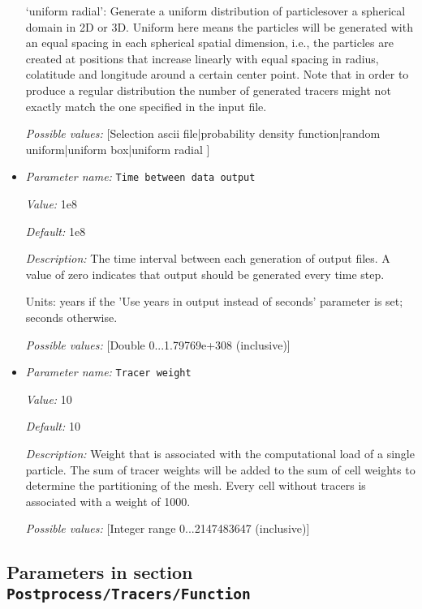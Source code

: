 \begin{itemize}
`uniform radial': Generate a uniform distribution of particlesover a spherical domain in 2D or 3D. Uniform here means the particles will be generated with an equal spacing in each spherical spatial dimension, i.e., the particles are created at positions that increase linearly with equal spacing in radius, colatitude and longitude around a certain center point. Note that in order to produce a regular distribution the number of generated tracers might not exactly match the one specified in the input file.


{\it Possible values:} [Selection ascii file|probability density function|random uniform|uniform box|uniform radial ]
\item {\it Parameter name:} {\tt Time between data output}
\label{parameters:Postprocess/Tracers/Time between data output}


{\it Value:} 1e8


{\it Default:} 1e8


{\it Description:} The time interval between each generation of output files. A value of zero indicates that output should be generated every time step.

Units: years if the 'Use years in output instead of seconds' parameter is set; seconds otherwise.


{\it Possible values:} [Double 0...1.79769e+308 (inclusive)]
\item {\it Parameter name:} {\tt Tracer weight}
\label{parameters:Postprocess/Tracers/Tracer weight}


{\it Value:} 10


{\it Default:} 10


{\it Description:} Weight that is associated with the computational load of a single particle. The sum of tracer weights will be added to the sum of cell weights to determine the partitioning of the mesh. Every cell without tracers is associated with a weight of 1000.


{\it Possible values:} [Integer range 0...2147483647 (inclusive)]
\end{itemize}



\subsection{Parameters in section \tt Postprocess/Tracers/Function}
\label{parameters:Postprocess/Tracers/Function}

